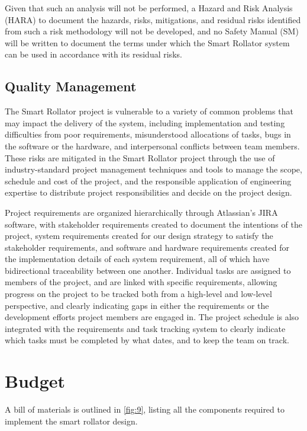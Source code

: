 \documentclass{article}
\begin{document}
Given that such an analysis will not be performed, a Hazard and Risk Analysis (HARA) to document the hazards, risks, mitigations, and residual risks identified from such a risk methodology will not be developed, and no Safety Manual (SM) will be written to document the terms under which the Smart Rollator system can be used in accordance with its residual risks. 

\subsection{Quality Management}
The Smart Rollator project is vulnerable to a variety of common problems that may impact the delivery of the system, including implementation and testing difficulties from poor requirements, misunderstood allocations of tasks, bugs in the software or the hardware, and interpersonal conflicts between team members. These risks are mitigated in the Smart Rollator project through the use of industry-standard project management techniques and tools to manage the scope, schedule and cost of the project, and the responsible application of engineering expertise to distribute project responsibilities and decide on the project design.

Project requirements are organized hierarchically through Atlassian’s JIRA software, with stakeholder requirements created to document the intentions of the project, system requirements created for our design strategy to satisfy the stakeholder requirements, and software and hardware requirements created for the implementation details of each system requirement, all of which have bidirectional traceability between one another. Individual tasks are assigned to members of the project, and are linked with specific requirements, allowing progress on the project to be tracked both from a high-level and low-level perspective, and clearly indicating gaps in either the requirements or the development efforts project members are engaged in. The project schedule is also integrated with the requirements and task tracking system to clearly indicate which tasks must be completed by what dates, and to keep the team on track.

\section {Budget}
A bill of materials is outlined in \autoref{fig:9}, listing all the components required to implement the smart rollator design. \\
\end{document}
